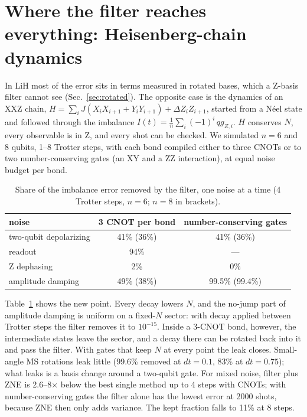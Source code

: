 \documentclass[11pt]{article}
\begin{document}
\section{Where the filter reaches everything: Heisenberg-chain dynamics}\label{sec:xxz}

In LiH most of the error sits in terms measured in rotated bases, which a Z-basis filter cannot see
(Sec.~\ref{sec:rotated}). The opposite case is the dynamics of an XXZ chain,
$H=\sum_i J(X_iX_{i+1}+Y_iY_{i+1})+\Delta Z_iZ_{i+1}$, started from a N\'eel state and followed through
the imbalance $I(t)=\frac1n\sum_i(-1)^i\,qg_{Z,i}$. $H$ conserves $N$, every observable is in Z, and
every shot can be checked. We simulated $n=6$ and 8 qubits, 1--8 Trotter steps, with each bond compiled
either to three CNOTs or to two number-conserving gates (an XY and a ZZ interaction), at equal noise
budget per bond.

\begin{table}[t]
\centering\small
\caption{Share of the imbalance error removed by the filter, one noise at a time (4 Trotter steps,
$n=6$; $n=8$ in brackets).}
\label{tab:xxz}
\begin{tabular}{lcc}
\toprule
noise & 3 CNOT per bond & number-conserving gates\\
\midrule
two-qubit depolarizing & 41\% (36\%) & 41\% (36\%)\\
readout & 94\% & ---\\
Z dephasing & 2\% & 0\%\\
amplitude damping & 49\% (38\%) & 99.5\% (99.4\%)\\
\bottomrule
\end{tabular}
\end{table}

Table~\ref{tab:xxz} shows the new point. Every decay lowers $N$, and the no-jump part of amplitude
damping is uniform on a fixed-$N$ sector: with decay applied between Trotter steps the filter removes it
to $10^{-15}$. Inside a 3-CNOT bond, however, the intermediate states leave the sector, and a decay
there can be rotated back into it and pass the filter. With gates that keep $N$ at every point the leak
closes. Small-angle MS rotations leak little (99.6\% removed at $dt=0.1$, 83\% at $dt=0.75$); what leaks
is a basis change around a two-qubit gate. For mixed noise, filter plus ZNE is 2.6--8$\times$ below the
best single method up to 4 steps with CNOTs; with number-conserving gates the filter alone has the lowest
error at 2000 shots, because ZNE then only adds variance. The kept fraction falls to 11\% at 8 steps.
\end{document}
